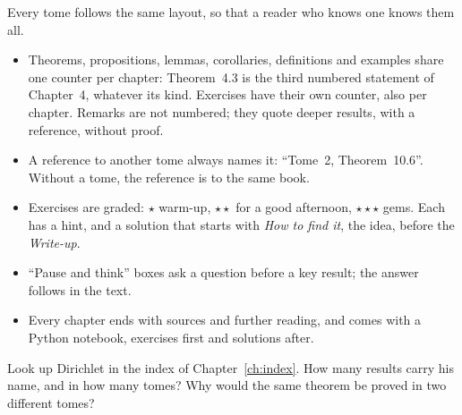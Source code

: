 Every tome follows the same layout, so that a reader who knows one knows them all.
\begin{itemize}
\item Theorems, propositions, lemmas, corollaries, definitions and examples share one counter per chapter: Theorem~4.3
is the third numbered statement of Chapter~4, whatever its kind. Exercises have their own counter, also per chapter.
Remarks are not numbered; they quote deeper results, with a reference, without proof.
\item A reference to another tome always names it: ``Tome~2, Theorem~10.6''. Without a tome, the reference is to the
same book.
\item Exercises are graded: $\star$ warm-up, $\star\star$ for a good afternoon, $\star\star\star$ gems. Each has a hint,
and a solution that starts with \emph{How to find it}, the idea, before the \emph{Write-up}.
\item ``Pause and think'' boxes ask a question before a key result; the answer follows in the text.
\item Every chapter ends with sources and further reading, and comes with a Python notebook, exercises first and
solutions after.
\end{itemize}

\begin{think}
Look up Dirichlet in the index of Chapter~\ref{ch:index}. How many results carry his name, and in how many tomes?
Why would the same theorem be proved in two different tomes?
\end{think}
